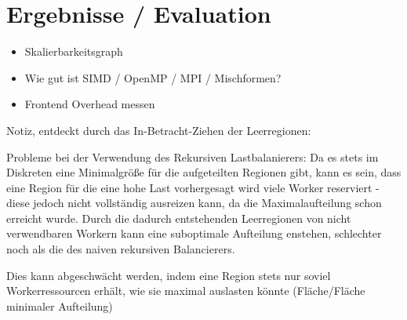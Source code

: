 \section{Ergebnisse / Evaluation}
\begin{itemize}
	\item Skalierbarkeitsgraph
	\item Wie gut ist SIMD / OpenMP / MPI / Mischformen?
	\item Frontend Overhead messen
\end{itemize}



Notiz, entdeckt durch das In-Betracht-Ziehen der Leerregionen:

Probleme bei der Verwendung des Rekursiven Lastbalanierers:
Da es stets im Diskreten eine Minimalgröße für die aufgeteilten Regionen gibt,
kann es sein, dass eine Region für die eine hohe Last vorhergesagt wird viele Worker reserviert -
diese jedoch nicht vollständig ausreizen kann, da die Maximalaufteilung schon erreicht wurde.
Durch die dadurch entstehenden Leerregionen von nicht verwendbaren Workern
kann eine suboptimale Aufteilung enstehen, schlechter noch als die des naiven rekursiven Balancierers.

Dies kann abgeschwächt werden, indem eine Region stets nur soviel Workerressourcen erhält,
wie sie maximal auslasten könnte (Fläche/Fläche minimaler Aufteilung)
